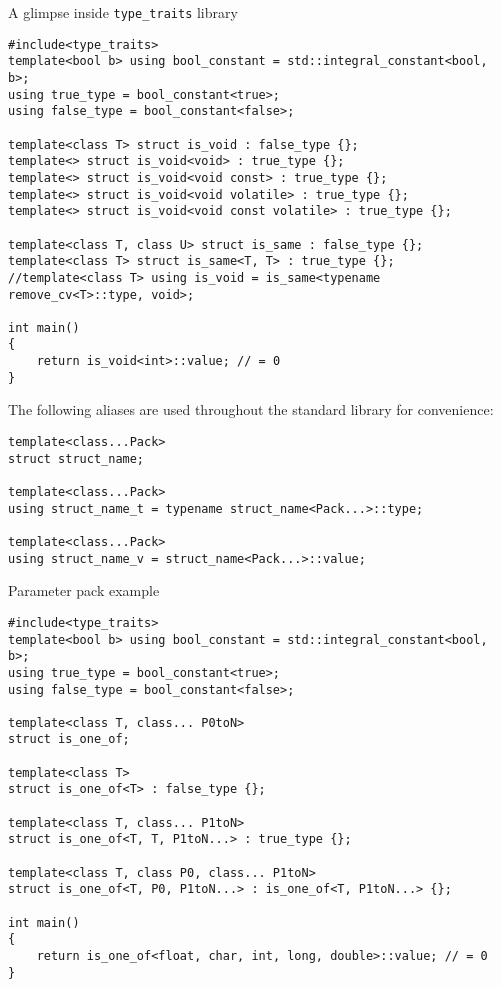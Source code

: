 \documentclass{beamer}
\begin{document}
\begin{frame}[fragile]{A glimpse inside \texttt{type\_traits} library}
\begin{lstlisting}
#include<type_traits>
template<bool b> using bool_constant = std::integral_constant<bool, b>;
using true_type = bool_constant<true>;
using false_type = bool_constant<false>;

template<class T> struct is_void : false_type {};
template<> struct is_void<void> : true_type {};
template<> struct is_void<void const> : true_type {};
template<> struct is_void<void volatile> : true_type {};
template<> struct is_void<void const volatile> : true_type {};

template<class T, class U> struct is_same : false_type {};
template<class T> struct is_same<T, T> : true_type {};
//template<class T> using is_void = is_same<typename remove_cv<T>::type, void>;

int main()
{
	return is_void<int>::value; // = 0
}
\end{lstlisting}
The following aliases are used throughout the standard library for convenience:
\begin{lstlisting}
template<class...Pack>
struct struct_name;

template<class...Pack>
using struct_name_t = typename struct_name<Pack...>::type;

template<class...Pack>
using struct_name_v = struct_name<Pack...>::value;
\end{lstlisting}
\end{frame}

\begin{frame}[fragile]{Parameter pack example}
\begin{lstlisting}
#include<type_traits>
template<bool b> using bool_constant = std::integral_constant<bool, b>;
using true_type = bool_constant<true>;
using false_type = bool_constant<false>;

template<class T, class... P0toN>
struct is_one_of;

template<class T>
struct is_one_of<T> : false_type {};

template<class T, class... P1toN>
struct is_one_of<T, T, P1toN...> : true_type {};

template<class T, class P0, class... P1toN>
struct is_one_of<T, P0, P1toN...> : is_one_of<T, P1toN...> {};

int main()
{
	return is_one_of<float, char, int, long, double>::value; // = 0
}
\end{lstlisting}
\end{frame}
\end{document}
